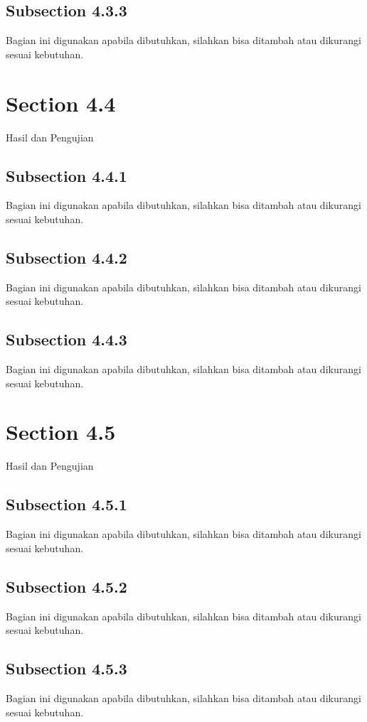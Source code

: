 \subsection{Subsection 4.3.3}
Bagian ini digunakan apabila dibutuhkan, silahkan bisa ditambah atau dikurangi sesuai kebutuhan.

\section{Section 4.4}
Hasil dan Pengujian

\subsection{Subsection 4.4.1}
Bagian ini digunakan apabila dibutuhkan, silahkan bisa ditambah atau dikurangi sesuai kebutuhan.

\subsection{Subsection 4.4.2}
Bagian ini digunakan apabila dibutuhkan, silahkan bisa ditambah atau dikurangi sesuai kebutuhan.

\subsection{Subsection 4.4.3}
Bagian ini digunakan apabila dibutuhkan, silahkan bisa ditambah atau dikurangi sesuai kebutuhan.

\section{Section 4.5}
Hasil dan Pengujian

\subsection{Subsection 4.5.1}
Bagian ini digunakan apabila dibutuhkan, silahkan bisa ditambah atau dikurangi sesuai kebutuhan.

\subsection{Subsection 4.5.2}
Bagian ini digunakan apabila dibutuhkan, silahkan bisa ditambah atau dikurangi sesuai kebutuhan.

\subsection{Subsection 4.5.3}
Bagian ini digunakan apabila dibutuhkan, silahkan bisa ditambah atau dikurangi sesuai kebutuhan.